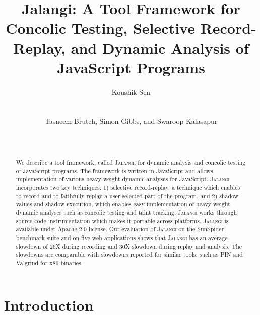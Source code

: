 \documentclass{sig-alternate}
\def\jalangi{\textsc{Jalangi}}
\begin{document}

\title{Jalangi: A Tool Framework for Concolic Testing, Selective
  Record-Replay, and Dynamic Analysis of JavaScript Programs}

\author{
\alignauthor
Koushik Sen\\
      \\
      \\
\alignauthor
Tasneem Brutch,  Simon Gibbs, and  Swaroop Kalasapur\\
\\
\\
}
\maketitle
\sloppy

\begin{abstract}
  We describe a tool framework, called \jalangi{}, for dynamic
  analysis and concolic testing of JavaScript programs.  The framework
  is written in JavaScript and allows implementation of various
  heavy-weight dynamic analyses for JavaScript. \jalangi{}
  incorporates two key techniques: 1) selective record-replay, a
  technique which enables to record and to faithfully replay a
  user-selected part of the program, and 2) shadow values and shadow
  execution, which enables easy implementation of heavy-weight dynamic
  analyses such as concolic testing and taint tracking.  \jalangi{}
  works through source-code instrumentation which makes it portable
  across platforms.  \jalangi{} is available under Apache 2.0 license.
  Our evaluation of \jalangi{} on the SunSpider benchmark suite and on
  five web applications shows that \jalangi{} has an average slowdown
  of 26X during recording and 30X slowdown during replay and analysis.
  The slowdowns are comparable with slowdowns reported for similar
  tools, such as PIN and Valgrind for x86 binaries.
\end{abstract}

\section{Introduction}
\end{document}
